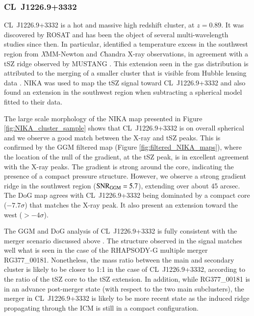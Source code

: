 \documentclass[twocolumn,traditabstract]{aa}
\begin{document}
\subsubsection{CL~J1226.9+3332}
\mbox{CL~J1226.9+3332} is a hot and massive high redshift cluster, at $z=0.89$. It was discovered by ROSAT \citep{Ebeling2001} and has been the object of several multi-wavelength studies since then. In particular, \cite{Maughan2007} identified a temperature excess in the southwest region from {\textit XMM-Newton} and {\textit Chandra} X-ray observations, in agreement with a tSZ ridge observed by MUSTANG \citep{Korngut2011}. This extension seen in the gas distribution is attributed to the merging of a smaller cluster that is visible from Hubble lensing data \citep{Jee2009}. NIKA was used to map the tSZ signal toward \mbox{CL~J1226.9+3332} and \cite{Adam2015} also found an extension in the southwest region when subtracting a spherical model fitted to their data.

The large scale morphology of the NIKA map presented in Figure \ref{fig:NIKA_cluster_sample} shows that \mbox{CL~J1226.9+3332} is on overall spherical and we observe a good match between the X-ray and tSZ peaks. This is confirmed by the GGM filtered map (Figure \ref{fig:filtered_NIKA_maps}), where the location of the null of the gradient, at the tSZ peak, is in excellent agreement with the X-ray peaks. The gradient is strong around the core, indicating the presence of a compact pressure structure. However, we observe a strong gradient ridge in the southwest region (${\rm SNR}_{\rm GGM} = 5.7$), extending over about 45 arcsec. The DoG map agrees with \mbox{CL~J1226.9+3332} being dominated by a compact core ($-7.7 \sigma$) that matches the X-ray peak. It also present an extension toward the west ($> -4 \sigma$).

The GGM and DoG analysis of \mbox{CL~J1226.9+3332} is fully consistent with the merger scenario discussed above \citep[see also][for more details]{Adam2015}. The structure observed in the signal matches well what is seen in the case of the RHAPSODY-G multiple merger RG377\_00181. Nonetheless, the mass ratio between the main and secondary cluster is likely to be closer to 1:1 in the case of \mbox{CL~J1226.9+3332}, according to the ratio of the tSZ core to the tSZ extension. In addition, while RG377\_00181 is in an advance post-merger state (with respect to the two main subclusters), the merger in \mbox{CL~J1226.9+3332} is likely to be more recent state as the induced ridge propagating through the ICM is still in a compact configuration.\\
\end{document}
